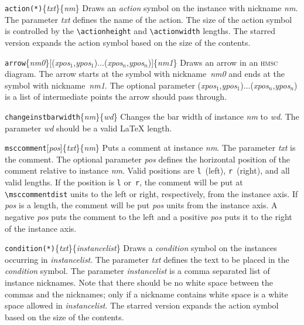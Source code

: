 \documentclass[a4paper]{article}
\newcommand{\cmd}[1]{\texttt{\bslash #1}}
\newcommand{\acro}[1]{{\scshape\lowercase{#1}}}
\newcommand\HMSC{\acro{HMSC}}
\newcommand{\opt}[1]{[#1]}
\newcommand{\cmdarg}[1]{\{\emph{#1}\}}
\newcommand{\coordarg}[1]{\emph{#1}}
\newcommand{\coordargs}[2]{(\coordarg{#1},\coordarg{#2})}
\newenvironment{defs}{%
  \begin{list}{}%
              {\setlength{\labelwidth}{0pt}%
               \setlength{\labelsep}{1em}%
               \setlength{\leftmargin}{1em}%
               \setlength{\parsep}{1ex}%
               \setlength{\listparindent}{0pt}%
               \setlength{\rightmargin}{0pt}%
               \renewcommand{\makelabel}[1]{##1}%
               \raggedright%
              }%
  }{%
  \end{list}}
\begin{document}
\begin{defs}

\item[\cmd{action(*)}\{\emph{txt}\}\{\emph{nm}\}] Draws an \emph{action}
symbol on the instance with nickname \emph{nm}. The parameter \emph{txt}
defines the name of the action. The size of the action symbol is
controlled by the \verb|\actionheight| and \verb|\actionwidth|
lengths. The starred version expands the action symbol based on the
size of the contents.

\item[\cmd{arrow}\cmdarg{nm0}\opt{\coordargs{xpos${}_1$}{ypos${}_1$}$\ldots$\coordargs{xpos${}_n$}{ypos${}_n$}}\cmdarg{nm1}]
Draws an arrow in an \HMSC{} diagram. The arrow starts at the symbol
with nickname~\emph{nm0} and ends at the symbol with
nickname~\emph{nm1}. The optional parameter
\coordargs{xpos${}_1$}{ypos${}_1$}$\ldots$\coordargs{xpos${}_n$}{ypos${}_n$}
is a list of intermediate points the arrow should pass through.

\item[\cmd{changeinstbarwidth}\{\emph{nm}\}\{\emph{wd}\}] Changes the
bar width of instance \emph{nm} to \emph{wd}. The parameter \emph{wd}
should be a valid \LaTeX{} length.

\item[\cmd{msccomment}\opt{\emph{pos}}\{\emph{txt}\}\{\emph{nm}\}] Puts a
comment at instance \emph{nm}. The parameter \emph{txt} is the
comment. The optional parameter \emph{pos} defines the horizontal
position of the comment relative to instance \emph{nm}. Valid
positions are \verb|l|~(left), \verb|r|~(right), and all valid
lengths. If the position is \verb|l| or~\verb|r|, the comment will be
put at \verb|\msccommentdist| units to the left or right, respectively, from
the instance axis. If \emph{pos} is a length, the comment will be put
\emph{pos} units from the instance axis. A negative \emph{pos} puts the
comment to the left and a positive \emph{pos} puts it to the right of
the instance axis.

\item[\cmd{condition(*)}\{\emph{txt}\}\{\emph{instancelist}\}] Draws a
\emph{condition} symbol on the instances occurring in
\emph{instancelist}. The parameter \emph{txt} defines the text to be
placed in the \emph{condition} symbol. The parameter
\emph{instancelist} is a comma separated list of instance
nicknames. Note that there should be no white space between the commas
and the nicknames; only if a nickname contains white space is a white
space allowed in \emph{instancelist}. The starred version expands the
action symbol based on the size of the contents.  


\end{defs}
\end{document}

